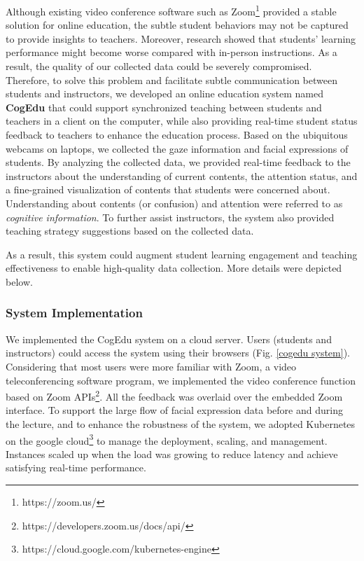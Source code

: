 Although existing video conference software such as Zoom\footnote{https://zoom.us/} provided a stable solution for online education, the subtle student behaviors may not be captured to provide insights to teachers. Moreover, research showed that students' learning performance might become worse compared with in-person instructions\cite{nguyen2015effectiveness}. As a result, the quality of our collected data could be severely compromised. 
%
Therefore, to solve this problem and facilitate subtle communication between students and instructors, we developed an online education system named \textbf{CogEdu} that could support synchronized teaching between students and teachers in a client on the computer, while also providing real-time student status feedback to teachers to enhance the education process.
%
Based on the ubiquitous webcams on laptops, we collected the gaze information and facial expressions of students. By analyzing the collected data, we provided real-time feedback to the instructors about the understanding of current contents, the attention status, and a fine-grained visualization of contents that students were concerned about. Understanding about contents (or confusion) and attention were referred to as \textit{cognitive information}. To further assist instructors, the system also provided teaching strategy suggestions based on the collected data. 

As a result, this system could augment student learning engagement and teaching effectiveness to enable high-quality data collection. More details were depicted below.



\subsubsection{\textbf{System Implementation}}

We implemented the CogEdu system on a cloud server. Users (students and instructors) could access the system using their browsers (Fig. \ref{cogedu system}). Considering that most users were more familiar with Zoom, a video teleconferencing software program, we implemented the video conference function based on Zoom APIs\footnote{https://developers.zoom.us/docs/api/}. All the feedback was overlaid over the embedded Zoom interface. To support the large flow of facial expression data before and during the lecture, and to enhance the robustness of the system, we adopted Kubernetes on the google cloud\footnote{https://cloud.google.com/kubernetes-engine} to manage the deployment, scaling, and management. Instances scaled up when the load was growing to reduce latency and achieve satisfying real-time performance.



